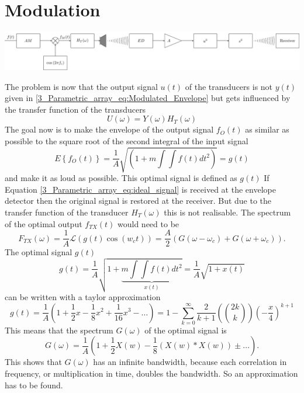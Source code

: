\section{Modulation}\label{3_Parametric_array_Sec:Modulation}
\begin{center}
    \includegraphics[width=\textwidth]{images/3_Parametric_array/Block_Diagram_Modulation.pdf}
\end{center}
The problem is now that the output signal $u(t)$ of the transducers is not $y(t)$ given in \ref{3_Parametric_array_eq:Modulated_Envelope} but gets influenced by the transfer function of the transducers
\begin{equation}
    U(\omega) = Y(\omega) H_T(\omega)
\end{equation}
The goal now is to make the envelope of the output signal $f_O(t)$ as similar as possible to the square root of the second integral of the input signal
\begin{equation}\label{3_Parametric_array_eq:ideal_signal}
    E \left \{ f_O(t) \right \} = \frac{1}{A}\sqrt{\left ( 1 + m \int \int f(t)dt^2 \right )} = g(t)
\end{equation}
and make it as loud as possible. This optimal signal is defined as $g(t)$
If Equation \ref{3_Parametric_array_eq:ideal_signal} is received at the envelope detector then the original signal is restored at the receiver.
But due to the transfer function of the transducer $H_T(\omega)$ this is not realisable.
The spectrum of the optimal output $f_{TX}(t)$ would need to be
\begin{equation}
    F_{TX}(\omega)
    =
    \frac{1}{A} \mathscr{L}\left ( g(t) \cos{(w_ct)} \right )
    = \frac{A}{2} (G(\omega -\omega_c) + G(\omega +\omega_c)).
\end{equation}
The optimal signal $g(t)$
\begin{equation}
    g(t) = \frac{1}{A}\sqrt{1 + \underbrace{m \int \int f(t)dt^2}_{x(t)}} =  \frac{1}{A}\sqrt{1 + x(t)}
\end{equation}
can be written with a taylor approximation
\begin{equation}
    g(t) 
    = 
    \frac{1}{A} \left ( 1 + \frac{1}{2}x - \frac{1}{8}x^2 + \frac{1}{16}x^3 - \dots \right ) 
    =
    1 - \sum_{k=0}^\infty \frac{2}{k+1} \left ( \binom{2k}{k} \right) \left ( -\frac{x}{4}\right )^{k+1}
\end{equation}
This means that the spectrum $G(\omega)$ of the optimal signal is
\begin{equation}
    G(\omega) = \frac{1}{A} \left ( 1 + \frac{1}{2}X(w) - \frac{1}{8}\left (X(w) * X(w)\right ) \pm \dots \right ).
\end{equation}
This shows that $G(\omega)$ has an infinite bandwidth, because each correlation in frequency, or multiplication in time, doubles the bandwidth.
So an approximation has to be found.
